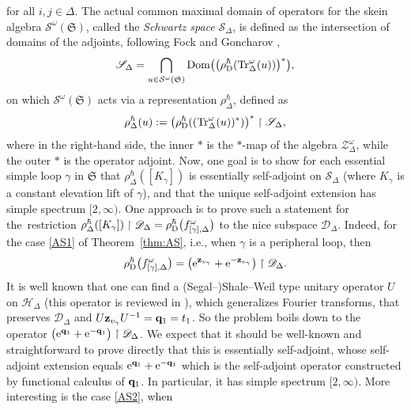 \documentclass[pdftex]{sigma}
\numberwithin{equation}{section}
\theoremstyle{definition}
\begin{document}
 for all $i,j \in \Delta$. The actual common maximal domain of operators for the skein algebra $\mathcal{S}^\omega(\mathfrak{S})$, called the {\em Schwartz space} $\mathscr{S}_\Delta$, is defined as the intersection of domains of the adjoints, following Fock and Goncharov \cite{FG09},
\begin{align}
\label{eq:Schwartz}
\mathscr{S}_\Delta = \bigcap_{u \in \mathcal{S}^\omega(\mathfrak{S})} {\rm Dom}\bigl( \bigl(\rho^\hbar_{\rm D}( {\rm Tr}^\omega_\Delta(u))\bigr)^* \bigr),
\end{align}
on which $\mathcal{S}^\omega(\mathfrak{S})$ acts via a representation $\rho^\hbar_\Delta$, defined as
\[
\rho^\hbar_\Delta(u) := \bigl(\rho^\hbar_{\rm D}(({\rm Tr}^\omega_\Delta(u))^*)\bigr)^* \restriction \mathscr{S}_\Delta,
\]
where in the right-hand side, the inner $*$ is the $*$-map of the algebra $\mathcal{Z}^\omega_\Delta$, while the outer $*$ is the operator adjoint.
Now, one goal is to show for each essential simple loop $\gamma$ in $\mathfrak{S}$ that $\rho^\hbar_\Delta([K_\gamma])$ is essentially self-adjoint on $\mathscr{S}_\Delta$ (where $K_\gamma$ is a constant elevation lift of $\gamma$), and that the unique self-adjoint extension  has simple spectrum $[2,\infty)$. One approach is to prove such a statement for the~restriction $\rho^\hbar_\Delta([K_\gamma])\restriction \mathscr{D}_\Delta = \rho^\hbar_{\rm D}\bigl(f^\omega_{[\gamma],\Delta}\bigr)$ to the nice subspace $\mathscr{D}_\Delta$.
Indeed, for the case \ref{AS1} of Theorem~\ref{thm:AS}, i.e., when $\gamma$ is a peripheral loop, then
\[
\rho^\hbar_{\rm D}\bigl(f^\omega_{[\gamma],\Delta}\bigr) = \bigl( {\rm e}^{{\bf z}_{v_\gamma}} + {\rm e}^{-{\bf z}_{v_\gamma}} \bigr) \restriction \mathscr{D}_\Delta.
\]
It is well known that one can find a (Segal--)Shale--Weil type unitary operator $U$ on $\mathscr{H}_\Delta$ (this operator is reviewed in \cite{Kim_irreducible}), which generalizes Fourier transforms, that preserves $\mathscr{D}_\Delta$ and $U {\bf z}_{v_\gamma} U^{-1} = {\bf q}_1 = t_1$. So the problem boils down to the operator $\bigl({\rm e}^{{\bf q}_1} + {\rm e}^{-{\bf q}_1}\bigr) \restriction \mathscr{D}_\Delta$. We expect that it should be well-known and straightforward to prove directly that this is essentially self-adjoint, whose self-adjoint extension equals ${\rm e}^{{\bf q}_1} + {\rm e}^{-{\bf q}_1}$ which is the self-adjoint operator constructed by functional calculus of ${\bf q}_1$. In particular, it has simple spectrum $[2,\infty)$.
More interesting is the case \ref{AS2}, when
\end{document}
